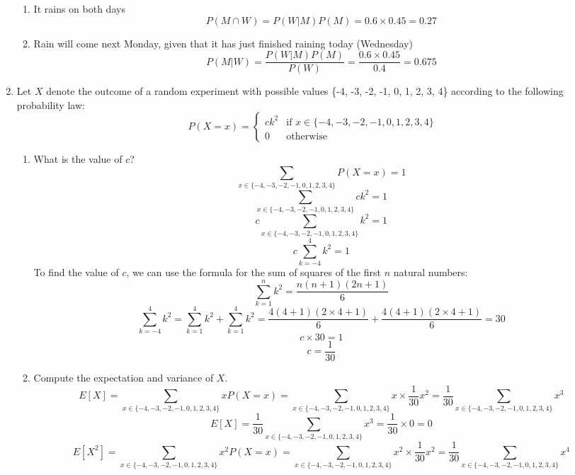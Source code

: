 \documentclass[a3paper,12pt]{extarticle} %
\begin{document}
\begin{enumerate}
    \begin{enumerate}
        \item It rains on both days
        \[
            P(M \cap W) = P(W | M)P(M) = 0.6 \times 0.45 = 0.27
        \]
        \item Rain will come next Monday, given that it has just finished raining today (Wednesday)
        \[
            P(M | W) = \frac{P(W | M)P(M)}{P(W)} = \frac{0.6 \times 0.45}{0.4} = 0.675
        \]
    \end{enumerate}
    \item Let \(X\) denote the outcome of a random experiment with possible values \{-4, -3, -2, -1, 0, 1, 2, 3, 4\} according to the following probability law:
    \[
        P(X = x) = 
    \begin{cases}
        ck^2 & \text{if } x \in \{-4, -3, -2, -1, 0, 1, 2, 3, 4\} \\
        0 & \text{otherwise}
    \end{cases}
    \]
    \begin{enumerate}
        \item What is the value of \(c\)?
        \[
            \sum_{x \in \{-4, -3, -2, -1, 0, 1, 2, 3, 4\}} P(X = x) = 1
        \]
        \[
            \sum_{x \in \{-4, -3, -2, -1, 0, 1, 2, 3, 4\}} ck^2 = 1
        \]
        \[
            c \sum_{x \in \{-4, -3, -2, -1, 0, 1, 2, 3, 4\}} k^2 = 1
        \]
        \[
            c \sum_{k = -4}^{4} k^2 = 1
        \]
        To find the value of \(c\), we can use the formula for the sum of squares of the first \(n\) natural numbers:
        \[
            \sum_{k = 1}^{n} k^2 = \frac{n(n+1)(2n+1)}{6}
        \]
        \[
            \sum_{k = -4}^{4} k^2 = \sum_{k = 1}^{4} k^2 + \sum_{k = 1}^{4} k^2 = \frac{4(4+1)(2 \times 4 + 1)}{6} + \frac{4(4+1)(2 \times 4 + 1)}{6} = 30
        \]
        \[
            c \times 30 = 1
        \]
        \[
            c = \frac{1}{30}
        \]
        \item Compute the expectation and variance of \(X\).
        \[
            E[X] = \sum_{x \in \{-4, -3, -2, -1, 0, 1, 2, 3, 4\}} xP(X = x) = \sum_{x \in \{-4, -3, -2, -1, 0, 1, 2, 3, 4\}} x \times \frac{1}{30}x^2 = \frac{1}{30} \sum_{x \in \{-4, -3, -2, -1, 0, 1, 2, 3, 4\}} x^3
        \]
        \[
            E[X] = \frac{1}{30} \sum_{x \in \{-4, -3, -2, -1, 0, 1, 2, 3, 4\}} x^3 = \frac{1}{30} \times 0 = 0
        \]
        \[
            E[X^2] = \sum_{x \in \{-4, -3, -2, -1, 0, 1, 2, 3, 4\}} x^2P(X = x) = \sum_{x \in \{-4, -3, -2, -1, 0, 1, 2, 3, 4\}} x^2 \times \frac{1}{30}x^2 = \frac{1}{30} \sum_{x \in \{-4, -3, -2, -1, 0, 1, 2, 3, 4\}} x^4
\]
\end{enumerate}
\end{enumerate}
\end{document}
